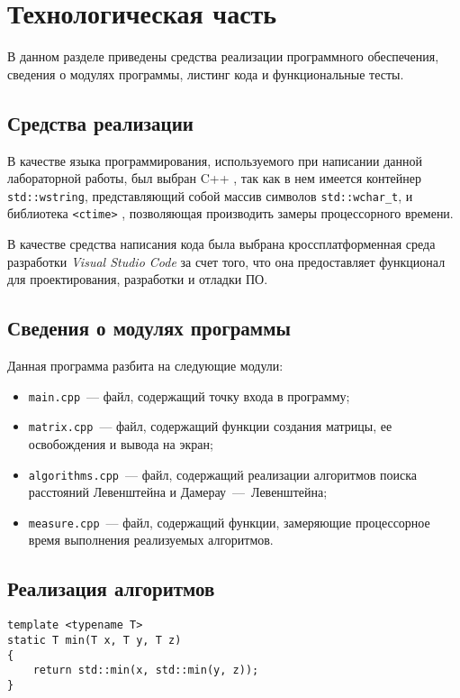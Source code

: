 \chapter{Технологическая часть}

В данном разделе приведены средства реализации программного обеспечения, сведения о модулях программы, листинг кода и функциональные тесты.

\section{Средства реализации}

В качестве языка программирования, используемого при написании данной лабораторной работы, был выбран C++ \cite{cpp-lang}, так как в нем имеется контейнер \texttt{std::wstring}, представляющий собой массив символов \texttt{std::wchar\_t}, и библиотека \texttt{<ctime>} \cite{ctime}, позволяющая производить замеры процессорного времени.

В качестве средства написания кода была выбрана кроссплатформенная среда разработки \textit{Visual Studio Code} за счет того, что она предоставляет функционал для проектирования, разработки и отладки ПО.

\section{Сведения о модулях программы}

Данная программа разбита на следующие модули:

\begin{itemize}
    \item \texttt{main.cpp}~--- файл, содержащий точку входа в программу;
    \item \texttt{matrix.cpp}~--- файл, содержащий функции создания матрицы, ее освобождения и вывода на экран;
    \item \texttt{algorithms.cpp}~--- файл, содержащий реализации алгоритмов поиска расстояний Левенштейна и Дамерау~---~Левенштейна;
    \item \texttt{measure.cpp}~--- файл, содержащий функции, замеряющие процессорное время выполнения реализуемых алгоритмов.
\end{itemize}

\clearpage
\section{Реализация алгоритмов}

\begin{lstlisting}[caption={Функция \texttt{min}, используемая в реализациях алгоритмов}]
template <typename T>
static T min(T x, T y, T z)
{
    return std::min(x, std::min(y, z));
}
\end{lstlisting}

